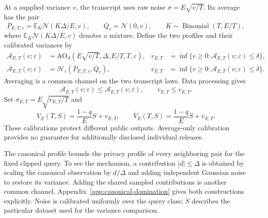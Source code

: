 \documentclass[11pt]{article}
\theoremstyle{remark}
\newcommand{\E}{\mathbb E}
\newcommand{\Normal}{\mathcal N}
\newcommand{\AO}{\mathrm{AO}}
\begin{document}
At a supplied variance $v$, the transcript uses raw noise
$\sigma=E\sqrt{v/T}$. Its average has the pair
\begin{equation}\label{eq:average-experiment}
 \overline P_{E,T,v}=\E_K\Normal(K\Delta/E,v),\qquad
 \overline Q_v=\Normal(0,v),\qquad
 K\sim\operatorname{Binomial}(T,E/T),
\end{equation}
where $\E_K\Normal(K\Delta/E,v)$ denotes a mixture. Define the two profiles
and their calibrated variances by
\begin{align*}
 \mathcal A_{E,T}(v;\varepsilon)
 &=\AO_S(E\sqrt{v/T},\Delta,E/T,T,\varepsilon),&
 v_{E,T}&=\inf\{v\geq0:\mathcal A_{E,T}(v;\varepsilon)\leq\delta\},\\
 \overline{\mathcal A}_{E,T}(v;\varepsilon)
 &=\mathcal H_\varepsilon(\overline P_{E,T,v},\overline Q_v),&
 \overline v_{E,T}&=\inf\{v\geq0:\overline{\mathcal A}_{E,T}(v;\varepsilon)\leq\delta\}.
\end{align*}
Averaging is a common channel on the two transcript laws. Data processing gives
\begin{equation}\label{eq:average-transcript-order}
 \overline{\mathcal A}_{E,T}(v;\varepsilon)\leq\mathcal A_{E,T}(v;\varepsilon),
 \qquad \overline v_{E,T}\leq v_{E,T}.
\end{equation}
Set $\sigma_{E,T}=E\sqrt{v_{E,T}/T}$ and
\[
 V_E(T,S)=\frac{1-q}{E}S+v_{E,T},\qquad
 \overline V_E(T,S)=\frac{1-q}{E}S+\overline v_{E,T}.
\]
These calibrations protect different public outputs. Average-only calibration
provides no guarantee for additionally disclosed individual releases.

The canonical profile bounds the privacy profile of every neighboring pair
for the fixed clipped query. To see the mechanism, a contribution
$|d|\leq\Delta$ is obtained by scaling the canonical observation by $d/\Delta$
and adding independent Gaussian noise to restore its variance. Adding the
shared sampled contributions is another common channel. Appendix~\ref{app:canonical-domination}
gives both constructions explicitly. Noise is calibrated uniformly over the
query class; $S$ describes the particular dataset used for the variance comparison.
\end{document}
